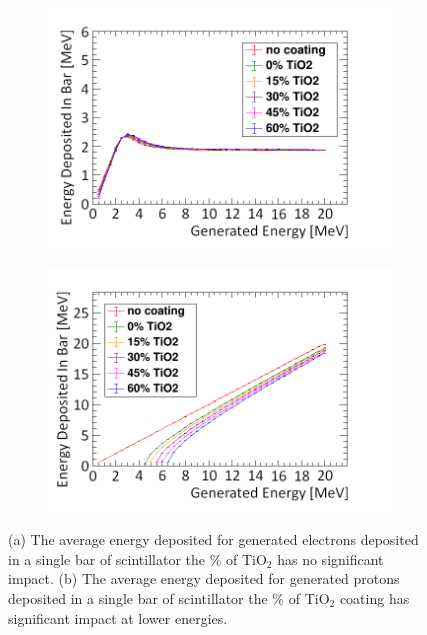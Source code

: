 \begin{figure}[!h]
\centering
\begin{subfigure}{.5\textwidth}
  \centering
  \includegraphics[width=\linewidth]{Chapter4/Figs/Raster/electronEdepTiO2Coating.png}
  \captionsetup{width=.9\linewidth}
  \caption{}
  \label{subFig:proton_TiO2}
\end{subfigure}%
\begin{subfigure}{.5\textwidth}
  \centering
  \includegraphics[width=\linewidth]{Chapter4/Figs/Raster/protonsEdepTiO2Coating.png}
  \captionsetup{width=.9\linewidth}
  \caption{}
  \label{subFig:muon_TiO2}
\end{subfigure}
\caption{(a) The average energy deposited for generated electrons deposited in a single bar of scintillator the \% of TiO$_2$ has no significant impact. (b) The average energy deposited for generated protons deposited in a single bar of scintillator the \%  of TiO$_2$ coating has significant impact at lower energies.}
\label{fig:muonProton_TiO2}
\end{figure}

